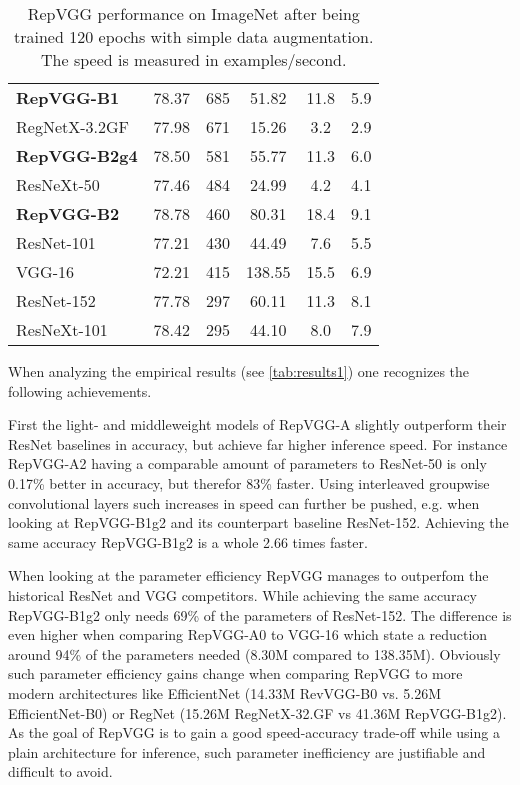 \begin{table}
\begin{center}
\begin{tabular}{lccccc}
			\hline
			\textbf{RepVGG-B1} & 78.37 & 685 & 51.82 & 11.8 & 5.9 \\
			RegNetX-3.2GF & 77.98 & 671 & 15.26 & 3.2 & 2.9 \\
			\hline
			\textbf{RepVGG-B2g4} & 78.50 & 581 & 55.77 & 11.3 & 6.0 \\
			ResNeXt-50 & 77.46 & 484 & 24.99 & 4.2 & 4.1 \\
			\hline
			\textbf{RepVGG-B2} & 78.78 & 460 & 80.31 & 18.4 & 9.1 \\
			ResNet-101 & 77.21 & 430 & 44.49 & 7.6 & 5.5 \\
			VGG-16 & 72.21 & 415 & 138.55 & 15.5 & 6.9 \\
			ResNet-152 & 77.78 & 297 & 60.11 & 11.3 & 8.1 \\
			ResNeXt-101 & 78.42 & 295 & 44.10 & 8.0 & 7.9 \\
			\hline
		\end{tabular}
	\end{center}
	\caption{RepVGG performance on ImageNet \cite{JiaDeng.2009} after being trained 120 epochs with simple data augmentation. The speed is measured in examples/second. \cite{XiaohanDing.2021}}
	\label{tab:results1}
\end{table}
\setlength{\tabcolsep}{6pt}

When analyzing the empirical results (see \autoref{tab:results1}) one recognizes the following achievements. 

First the light- and middleweight models of RepVGG-A slightly outperform their ResNet baselines in accuracy, but achieve far higher inference speed. For instance RepVGG-A2 having a comparable amount of parameters to ResNet-50 is only 0.17\% better in accuracy, but therefor 83\% faster. Using interleaved groupwise convolutional layers such increases in speed can further be pushed, e.g. when looking at RepVGG-B1g2 and its counterpart baseline ResNet-152. Achieving the same accuracy RepVGG-B1g2 is a whole 2.66 times faster. 

When looking at the parameter efficiency RepVGG manages to outperfom the historical ResNet and VGG competitors. While achieving the same accuracy RepVGG-B1g2 only needs 69\% of the parameters of ResNet-152. The difference is even higher when comparing RepVGG-A0 to VGG-16 which state a reduction around 94\% of the parameters needed (8.30M compared to 138.35M). Obviously such parameter efficiency gains change when comparing RepVGG to more modern architectures like EfficientNet (14.33M RevVGG-B0 vs. 5.26M EfficientNet-B0) or RegNet (15.26M RegNetX-32.GF vs 41.36M RepVGG-B1g2). As the goal of RepVGG is to gain a good speed-accuracy trade-off while using a plain architecture for inference, such parameter inefficiency are justifiable and difficult to avoid. 


